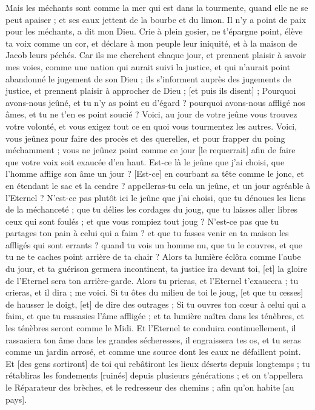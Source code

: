 \begin{multicols}{2}
Mais les méchants sont comme la mer qui est dans la tourmente, quand elle ne se peut apaiser ; et ses eaux jettent de la bourbe et du limon.
Il n'y a point de paix pour les méchants, a dit mon Dieu.
\VerseOne{}Crie à plein gosier, ne t'épargne point, élève ta voix comme un cor, et déclare à mon peuple leur iniquité, et à la maison de Jacob leurs péchés.
Car ils me cherchent chaque jour, et prennent plaisir à savoir mes voies, comme une nation qui aurait suivi la justice, et qui n'aurait point abandonné le jugement de son Dieu ; ils s'informent auprès des jugements de justice, et prennent plaisir à approcher de Dieu ; [et puis ils disent] ;
Pourquoi avons-nous jeûné, et tu n'y as point eu d'égard ? pourquoi avons-nous affligé nos âmes, et tu ne t'en es point soucié ? Voici, au jour de votre jeûne vous trouvez votre volonté, et vous exigez tout ce en quoi vous tourmentez les autres.
Voici, vous jeûnez pour faire des procès et des querelles, et pour frapper du poing méchamment ; vous ne jeûnez point comme ce jour [le requerrait] afin de faire que votre voix soit exaucée d'en haut.
Est-ce là le jeûne que j'ai choisi, que l'homme afflige son âme un jour ? [Est-ce] en courbant sa tête comme le jonc, et en étendant le sac et la cendre ? appelleras-tu cela un jeûne, et un jour agréable à l'Eternel ?
N'est-ce pas plutôt ici le jeûne que j'ai choisi, que tu dénoues les liens de la méchanceté ; que tu délies les cordages du joug, que tu laisses aller libres ceux qui sont foulés ; et que vous rompiez tout joug ?
N'est-ce pas que tu partages ton pain à celui qui a faim ? et que tu fasses venir en ta maison les affligés qui sont errants ? quand tu vois un homme nu, que tu le couvres, et que tu ne te caches point arrière de ta chair ?
Alors ta lumière éclôra comme l'aube du jour, et ta guérison germera incontinent, ta justice ira devant toi, [et] la gloire de l'Eternel sera ton arrière-garde.
Alors tu prieras, et l'Eternel t'exaucera ; tu crieras, et il dira ; me voici. Si tu ôtes du milieu de toi le joug, [et que tu cesses] de hausser le doigt, [et] de dire des outrages ;
Si tu ouvres ton cœur à celui qui a faim, et que tu rassasies l'âme affligée ; et ta lumière naîtra dans les ténèbres, et les ténèbres seront comme le Midi.
Et l'Eternel te conduira continuellement, il rassasiera ton âme dans les grandes sécheresses, il engraissera tes os, et tu seras comme un jardin arrosé, et comme une source dont les eaux ne défaillent point.
Et [des gens sortiront] de toi qui rebâtiront les lieux déserts depuis longtemps ; tu rétabliras les fondements [ruinés] depuis plusieurs générations ; et on t'appellera le Réparateur des brèches, et le redresseur des chemins ; afin qu'on habite [au pays].

\end{multicols}
